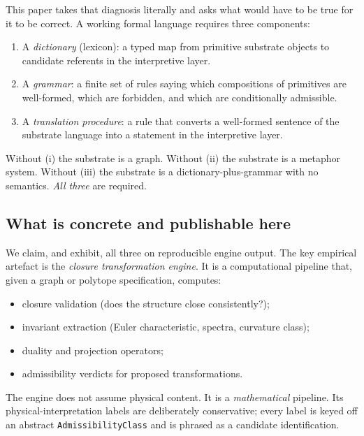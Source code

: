 \documentclass[11pt,a4paper]{article}
\begin{document}
This paper takes that diagnosis literally and asks what would have
to be true for it to be correct. A working formal language requires
three components:

\begin{enumerate}[leftmargin=*]
  \item A \emph{dictionary} (lexicon): a typed map from primitive
        substrate objects to candidate referents in the
        interpretive layer.
  \item A \emph{grammar}: a finite set of rules saying which
        compositions of primitives are well-formed, which are
        forbidden, and which are conditionally admissible.
  \item A \emph{translation procedure}: a rule that converts a
        well-formed sentence of the substrate language into a
        statement in the interpretive layer.
\end{enumerate}

Without (i) the substrate is a graph. Without (ii) the substrate is
a metaphor system. Without (iii) the substrate is a
dictionary-plus-grammar with no semantics. \emph{All three} are
required.

\subsection{What is concrete and publishable here}

We claim, and exhibit, all three on reproducible engine output. The
key empirical artefact is the \emph{closure transformation engine}.
It is a computational pipeline that, given a graph or polytope
specification, computes:

\begin{itemize}[leftmargin=*]
  \item closure validation (does the structure close consistently?);
  \item invariant extraction (Euler characteristic, spectra,
        curvature class);
  \item duality and projection operators;
  \item admissibility verdicts for proposed transformations.
\end{itemize}

The engine does not assume physical content. It is a
\emph{mathematical} pipeline. Its physical-interpretation labels
are deliberately conservative; every label is keyed off an abstract
\texttt{Admissibility\-Class} and is phrased as a candidate
identification.
\end{document}
